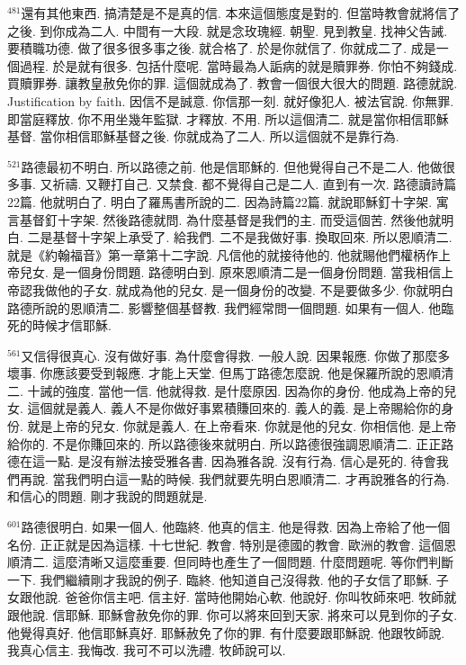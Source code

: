 \documentclass{book}
\begin{document}
$^{481}$還有其他東西.
搞清楚是不是真的信.
本來這個態度是對的.
但當時教會就將信了之後.
到你成為二人.
中間有一大段.
就是念玫瑰經.
朝聖.
見到教皇.
找神父告誡.
要積職功德.
做了很多很多事之後.
就合格了.
於是你就信了.
你就成二了.
成是一個過程.
於是就有很多.
包括什麼呢.
當時最為人詬病的就是贖罪券.
你怕不夠錢成.
買贖罪券.
讓教皇赦免你的罪.
這個就成為了.
教會一個很大很大的問題.
路德就說.
Justification by faith.
因信不是誠意.
你信那一刻.
就好像犯人.
被法官說.
你無罪.
即當庭釋放.
你不用坐幾年監獄.
才釋放.
不用.
所以這個清二.
就是當你相信耶穌基督.
當你相信耶穌基督之後.
你就成為了二人.
所以這個就不是靠行為.

$^{521}$路德最初不明白.
所以路德之前.
他是信耶穌的.
但他覺得自己不是二人.
他做很多事.
又祈禱.
又鞭打自己.
又禁食.
都不覺得自己是二人.
直到有一次.
路德讀詩篇22篇.
他就明白了.
明白了羅馬書所說的二.
因為詩篇22篇.
就說耶穌釘十字架.
寓言基督釘十字架.
然後路德就問.
為什麼基督是我們的主.
而受這個苦.
然後他就明白.
二是基督十字架上承受了.
給我們.
二不是我做好事.
換取回來.
所以恩順清二.
就是《約翰福音》第一章第十二字說.
凡信他的就接待他的.
他就賜他們權柄作上帝兒女.
是一個身份問題.
路德明白到.
原來恩順清二是一個身份問題.
當我相信上帝認我做他的子女.
就成為他的兒女.
是一個身份的改變.
不是要做多少.
你就明白路德所說的恩順清二.
影響整個基督教.
我們經常問一個問題.
如果有一個人.
他臨死的時候才信耶穌.

$^{561}$又信得很真心.
沒有做好事.
為什麼會得救.
一般人說.
因果報應.
你做了那麼多壞事.
你應該要受到報應.
才能上天堂.
但馬丁路德怎麼說.
他是保羅所說的恩順清二.
十誡的強度.
當他一信.
他就得救.
是什麼原因.
因為你的身份.
他成為上帝的兒女.
這個就是義人.
義人不是你做好事累積賺回來的.
義人的義.
是上帝賜給你的身份.
就是上帝的兒女.
你就是義人.
在上帝看來.
你就是他的兒女.
你相信他.
是上帝給你的.
不是你賺回來的.
所以路德後來就明白.
所以路德很強調恩順清二.
正正路德在這一點.
是沒有辦法接受雅各書.
因為雅各說.
沒有行為.
信心是死的.
待會我們再說.
當我們明白這一點的時候.
我們就要先明白恩順清二.
才再說雅各的行為.
和信心的問題.
剛才我說的問題就是.

$^{601}$路德很明白.
如果一個人.
他臨終.
他真的信主.
他是得救.
因為上帝給了他一個名份.
正正就是因為這樣.
十七世紀.
教會.
特別是德國的教會.
歐洲的教會.
這個恩順清二.
這麼清晰又這麼重要.
但同時也產生了一個問題.
什麼問題呢.
等你們判斷一下.
我們繼續剛才我說的例子.
臨終.
他知道自己沒得救.
他的子女信了耶穌.
子女跟他說.
爸爸你信主吧.
信主好.
當時他開始心軟.
他說好.
你叫牧師來吧.
牧師就跟他說.
信耶穌.
耶穌會赦免你的罪.
你可以將來回到天家.
將來可以見到你的子女.
他覺得真好.
他信耶穌真好.
耶穌赦免了你的罪.
有什麼要跟耶穌說.
他跟牧師說.
我真心信主.
我悔改.
我可不可以洗禮.
牧師說可以.
\end{document}

